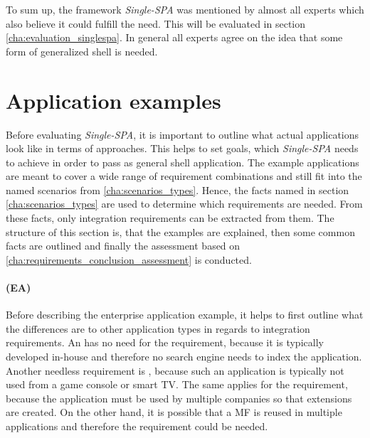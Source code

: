 To sum up, the framework \textit{Single-SPA} was mentioned by almost all experts which also believe it could fulfill the need.
This will be evaluated in section \ref{cha:evaluation_singlespa}.
In general all experts agree on the idea that some form of generalized shell is needed.





\section{Application examples}\label{cha:evaluation_example}

Before evaluating \textit{Single-SPA}, it is important to outline what actual applications look like in terms of approaches.
This helps to set goals, which \textit{Single-SPA} needs to achieve in order to pass as general shell application.
The example applications are meant to cover a wide range of requirement combinations and still fit into the named scenarios from \ref{cha:scenarios_types}.
Hence, the facts named in section \ref{cha:scenarios_types} are used to determine which requirements are needed.
From these facts, only integration requirements can be extracted from them.
The structure of this section is, that the examples are explained, then some common facts are outlined and finally the assessment based on \ref{cha:requirements_conclusion_assessment} is conducted.



\paragraph{ (EA)}\label{cha:evaluation_enterprise}

Before describing the enterprise application example, it helps to first outline what the differences are to other application types in regards to integration requirements.
An  has no need for the  requirement, because it is typically developed in-house and therefore no search engine needs to index the application.
Another needless requirement is , because such an application is typically not used from a game console or smart TV.
The same applies for the  requirement, because the application must be used by multiple companies so that extensions are created.
On the other hand, it is possible that a \ac{MF} is reused in multiple applications and therefore the  requirement could be needed.

